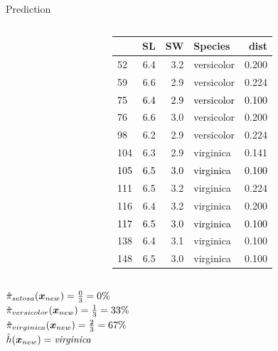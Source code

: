 \documentclass[11pt,compress,t,notes=noshow, xcolor=table]{beamer}
\newenvironment{knitrout}{}{} %
\begin{document}
\begin{vbframe}{Prediction}
\begin{columns}[T]
\begin{column}{0.5\textwidth}
\begin{knitrout}
{}



\end{knitrout}
  \end{column}
  \begin{column}{0.5\textwidth}
\begin{knitrout}\scriptsize
{}\color{fgcolor}
\begin{tabular}{l|r|r|l|r}
\hline
  & SL & SW & Species & dist\\
\hline
52 & 6.4 & 3.2 & versicolor & 0.200\\
\hline
59 & 6.6 & 2.9 & versicolor & 0.224\\
\hline
\rowcolor[HTML]{DFECFF}  \textcolor{black}{75} & \textcolor{black}{6.4} & \textcolor{black}{2.9} & \textcolor{black}{versicolor} & \textcolor{black}{0.100}\\
\hline
76 & 6.6 & 3.0 & versicolor & 0.200\\
\hline
98 & 6.2 & 2.9 & versicolor & 0.224\\
\hline
104 & 6.3 & 2.9 & virginica & 0.141\\
\hline
\rowcolor[HTML]{DFECFF}  \textcolor{black}{105} & \textcolor{black}{6.5} & \textcolor{black}{3.0} & \textcolor{black}{virginica} & \textcolor{black}{0.100}\\
\hline
111 & 6.5 & 3.2 & virginica & 0.224\\
\hline
116 & 6.4 & 3.2 & virginica & 0.200\\
\hline
\rowcolor[HTML]{DFECFF}  \textcolor{black}{117} & \textcolor{black}{6.5} & \textcolor{black}{3.0} & \textcolor{black}{virginica} & \textcolor{black}{0.100}\\
\hline
138 & 6.4 & 3.1 & virginica & 0.100\\
\hline
148 & 6.5 & 3.0 & virginica & 0.100\\
\hline
\end{tabular}


\end{knitrout}
  \end{column}
\end{columns}
\vspace{0.6cm}
$ \hat{\pi}_{setosa}(\bm{x}_{new}) = \frac{0}{3} = 0\% $ \\
$ \hat{\pi}_{versicolor}(\bm{x}_{new}) = \frac{1}{3} = 33\% $ \\
$ \hat{\pi}_{virginica}(\bm{x}_{new}) = \frac{2}{3} = 67\% $ \\
$ \hat{h}(\bm{x}_{new}) = \textit{virginica}$

\end{vbframe}
\end{document}
